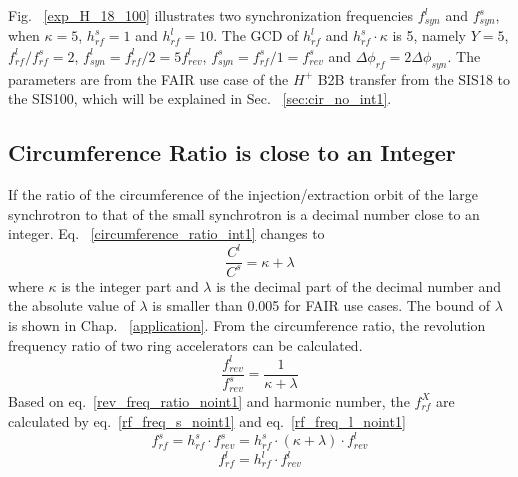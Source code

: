 Fig. ~\ref{exp_H_18_100} illustrates two synchronization frequencies $f_{\mathit{syn}}^{l}$ and $f_{\mathit{syn}}^{s}$, when $\kappa=5$, $h^s_\mathit{rf}=1$ and $h^l_\mathit{rf}=10$. The GCD of $h^l_\mathit{rf}$ and $h^s_\mathit{rf} \cdot \kappa$ is 5, namely $Y=5$, $f_{\mathit{rf}}^{l}/f_{\mathit{rf}}^{s}=2$, $f_{\mathit{syn}}^{l}=f_{\mathit{rf}}^{l}/2=5f_{\mathit{rev}}^{l}$, $f_{\mathit{syn}}^{s}=f_{\mathit{rf}}^{s}/1=f_{\mathit{rev}}^{s}$ and $\Delta \phi_\mathit{rf}=2\Delta \phi_\mathit{syn}$.  The parameters are from the FAIR use case of the $H^{+}$ B2B transfer from the SIS18 to the SIS100, which will be explained in Sec. ~\ref{sec:cir_no_int1}.


\subsection{Circumference Ratio is close to an Integer}
\label{sec:cir_close_an_int}
If the ratio of the circumference of the injection/extraction orbit of the large synchrotron to that of the small synchrotron is a decimal number close to an integer. Eq. ~\ref{circumference_ratio_int1} changes to 
\begin{equation}
\frac{C^l}{C^s}= \kappa + \lambda \label{circumference_ratio_noint0}
\end{equation}
where $\kappa$ is the integer part and $\lambda$ is the decimal part of the decimal number and the absolute value of $\lambda$ is smaller than 0.005 for FAIR use cases. The bound of $\lambda$ is shown in Chap. ~\ref{application}. From the circumference ratio, the revolution frequency ratio of two ring accelerators can be calculated.
\begin{equation}
\frac{f_{\mathit{rev}}^{l}}{f_{\mathit{rev}}^{s}}=\frac{1}{ \kappa+ \lambda} \label{rev_freq_ratio_noint1}
\end{equation}
Based on eq.~\ref{rev_freq_ratio_noint1} and harmonic number, the $f_{\mathit{rf}}^{X}$ are calculated by eq.~\ref{rf_freq_s_noint1} and eq.~\ref{rf_freq_l_noint1}
\begin{equation} 
f_{\mathit{rf}}^{s}= h^s_\mathit{rf} \cdot f_{\mathit{rev}}^{s}=h^s_\mathit{rf} \cdot ( \kappa+ \lambda) \cdot f_{\mathit{rev}}^{l} \label{rf_freq_s_noint1}
\end{equation}
\begin{equation} 
f_{\mathit{rf}}^{l}= h^l_\mathit{rf} \cdot f_{\mathit{rev}}^{l} \label{rf_freq_l_noint1}
\end{equation}

